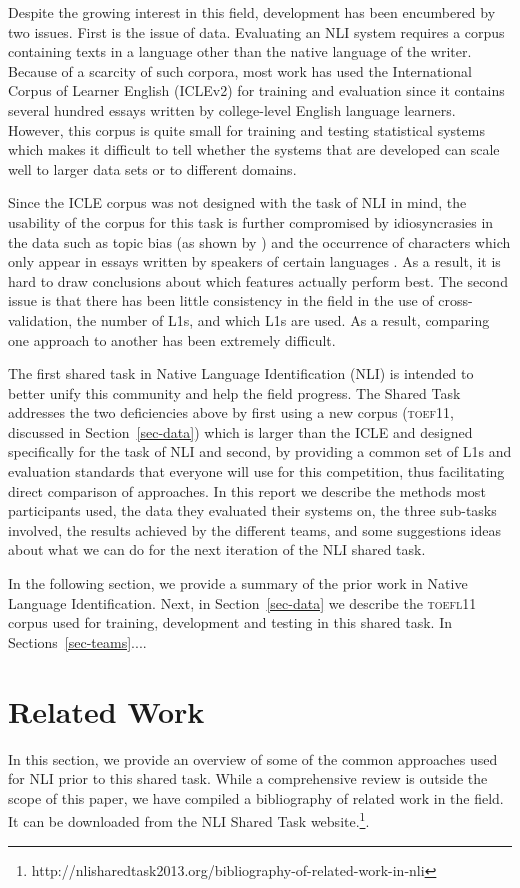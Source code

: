 \documentclass[11pt,letterpaper]{article}
\begin{document}
Despite the growing interest in this field, development has been encumbered
by two issues. First is the issue of data. Evaluating an NLI system requires
 a corpus containing texts in a language other than the native language of
the writer. Because of a scarcity of such corpora, most work has used
the International Corpus of Learner English (ICLEv2) \cite{Granger2009}
for training and evaluation since it contains several hundred essays
written by college-level English language learners. However,
this corpus is quite small for training and testing statistical systems
which makes it difficult to tell whether the systems that are developed can
scale well to larger data sets or to different domains.

Since the ICLE corpus was not designed with the task of NLI in mind, the
usability of the corpus for this task is further compromised by idiosyncrasies
in the data such as topic bias (as shown by ) and the
occurrence of characters which only appear in essays written by speakers of
certain languages \cite{tetreault-EtAl:2012:PAPERS}. As a result, it is hard to
draw conclusions about which features actually perform best. The second issue is
that there has been little consistency in the field in the use of
cross-validation, the number of L1s, and which L1s are used. As a result,
comparing one approach to another has been extremely difficult.

The first shared task in Native Language Identification (NLI) is intended to
better unify this community and help the field progress. The Shared Task
addresses the two deficiencies above by first using a new corpus (\textsc{toef11},
discussed in Section~\ref{sec-data}) which is larger than the ICLE and designed specifically for the
task of NLI and second, by providing a common set of L1s and evaluation
standards that everyone will use for this competition, thus facilitating direct
comparison of approaches. In this report we describe the methods most
participants used, the data they evaluated their systems on, the three sub-tasks
involved, the results achieved by the different teams, and some suggestions
ideas about what we can do for the next iteration of the NLI shared task.

In the following section, we provide a summary of the prior work in
Native Language Identification.  Next, in Section~\ref{sec-data} we describe 
the \textsc{toefl11} corpus used for training, development and testing in 
this shared task. In Sections~\ref{sec-teams}....

\section{Related Work}
\label{sec-relatedwork}
In this section, we provide an overview of some of the common
approaches used for NLI prior to this shared task.  While a
comprehensive review is outside the scope of this paper, we have compiled a 
bibliography of related work in the field. It can be downloaded 
from the NLI Shared Task website.\footnote{http://nlisharedtask2013.org/bibliography-of-related-work-in-nli}.
\end{document}
